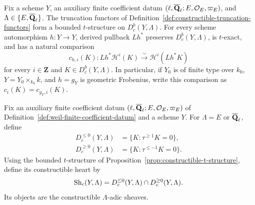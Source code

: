 \begin{proposition}
\label{prop:constructible-t-structure}


Fix a scheme \(Y\), an auxiliary finite coefficient datum
\((\ell,\overline{\mathbf Q}_\ell;E,\mathcal O_E,\varpi_E)\), and
\(\Lambda\in\{E,\overline{\mathbf Q}_\ell\}\).  The truncation functors of
Definition~\ref{def:constructible-truncation-functors} form a bounded
\(t\)-structure on \(D^b_c(Y,\Lambda)\).  For every scheme automorphism
\(h:Y\to Y\), derived pullback \(Lh^*\) preserves
\(D^b_c(Y,\Lambda)\), is \(t\)-exact, and has a natural comparison
\[
 c_{h,i}(K):Lh^*\mathcal H^i(K)
 \xrightarrow{\sim}\mathcal H^i(Lh^*K)
\]
for every \(i\in\mathbf Z\) and \(K\in D^b_c(Y,\Lambda)\).  In particular,
if \(Y_0\) is of finite type over \(k_0\),
\(Y=Y_0\times_{k_0}k\), and \(h=g_Y\) is geometric Frobenius, write this
comparison as \(c_i(K)=c_{g_Y,i}(K)\).
\end{proposition}



\begin{definition}
\label{def:constructible-heart}


Fix an auxiliary finite coefficient datum
\((\ell,\overline{\mathbf Q}_\ell;E,\mathcal O_E,\varpi_E)\) of
Definition~\ref{def:weil-finite-coefficient-datum} and a scheme \(Y\).
For \(\Lambda=E\) or \(\overline{\mathbf Q}_\ell\), define
\[
\begin{aligned}
 D^{\leq0}_c(Y,\Lambda)&=
 \{K:\tau^{\geq1}K=0\},\\
 D^{\geq0}_c(Y,\Lambda)&=
 \{K:\tau^{\leq-1}K=0\}.
\end{aligned}
\]
Using the bounded \(t\)-structure of
Proposition~\ref{prop:constructible-t-structure}, define its constructible
heart by
\[
 \operatorname{Sh}_c(Y,\Lambda)=D^{\leq0}_c(Y,\Lambda)
 \cap D^{\geq0}_c(Y,\Lambda).
\]
Its objects are the constructible \(\Lambda\)-adic sheaves.
\end{definition}


